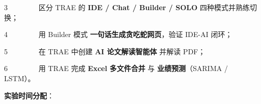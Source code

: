 \documentclass[
  american,
  chinese,
]{ctexart}
\begin{document}
\foreignlanguage{american}{{3{~~~~~~~~
}}}{\foreignlanguage{american}{区分}}\foreignlanguage{american}{ TRAE }\foreignlanguage{american}{的}\foreignlanguage{american}{ \textbf{IDE / Chat / Builder / SOLO} }{{\foreignlanguage{american}{四种模式并熟练切换}}}{\foreignlanguage{american}{；}}

\foreignlanguage{american}{{4{~~~~~~~~
}}}\foreignlanguage{american}{用}\foreignlanguage{american}{ Builder }{\foreignlanguage{american}{模式}}\foreignlanguage{american}{ }{\textbf{\foreignlanguage{american}{一句话生成贪吃蛇网页}}\foreignlanguage{american}{，验证}}\foreignlanguage{american}{ IDE-AI }{{\foreignlanguage{american}{闭环}}}{\foreignlanguage{american}{；}}

\foreignlanguage{american}{{5{~~~~~~~~
}}}{在}\foreignlanguage{american}{ TRAE }{中创建}{ \textbf{\foreignlanguage{american}{AI }}}\textbf{{论文解读智能体}}{ }{并解读}\foreignlanguage{american}{ PDF}{；}\foreignlanguage{american}{}

\foreignlanguage{american}{{6{~~~~~~~~
}}}\foreignlanguage{american}{用}\foreignlanguage{american}{ TRAE }{\foreignlanguage{american}{完成}}\foreignlanguage{american}{ \textbf{Excel} }{\textbf{\foreignlanguage{american}{多文件合并}}}\foreignlanguage{american}{ }\foreignlanguage{american}{与}\foreignlanguage{american}{ }{\textbf{\foreignlanguage{american}{业绩预测}}\foreignlanguage{american}{（}\foreignlanguage{american}{SARIMA}}\foreignlanguage{american}{ / LSTM}\foreignlanguage{american}{）。}

\textbf{{实验时间}}{\textbf{\foreignlanguage{american}{分配}}}\foreignlanguage{american}{：}
\end{document}
